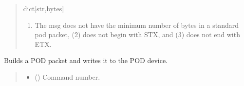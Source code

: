 \documentclass[letterpaper,10pt,english]{sphinxmanual}
\begin{document}
\begin{fulllineitems}
\begin{fulllineitems}
\begin{quote}
\begin{description}
\sphinxAtStartPar
dict{[}str,bytes{]}

\sphinxAtStartPar
{} \textendash{} \begin{enumerate}
%
\item {} 
\sphinxAtStartPar
The msg does not have the minimum number of bytes in a standard pod packet,                 (2) does not begin with STX, and (3) does not end with ETX.

\end{enumerate}


\end{description}\end{quote}

\end{fulllineitems}


\begin{fulllineitems}
\label{\detokenize{BasicPodProtocol:BasicPodProtocol.POD_Basics.WritePacket}}
\pysigstartsignatures
{}
\pysigstopsignatures
\sphinxAtStartPar
Builds a POD packet and writes it to the POD device.
\begin{quote}\begin{description}
\begin{itemize}
\item {} 
\sphinxAtStartPar
{} (\sphinxstyleliteralemphasis{\sphinxupquote{ | }}) \textendash{} Command number.


\end{itemize}
\end{description}
\end{quote}
\end{fulllineitems}
\end{fulllineitems}
\end{document}
